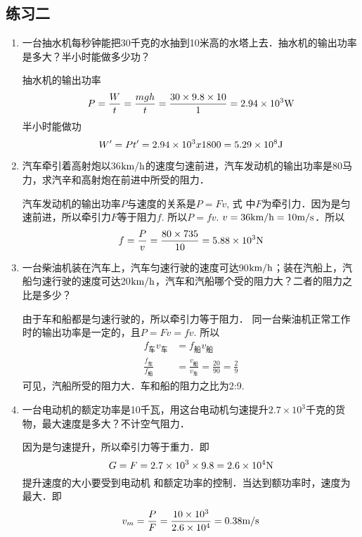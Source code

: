 \subsection{练习二}
\begin{enumerate}
    \item 一台抽水机每秒钟能把30千克的水抽到10米高的水塔上去．抽水机的输出功率是多大？半小时能做多少功？

    \begin{solution}
        抽水机的输出功率
\[P=\frac{W}{t}=\frac{mgh}{t}=\frac{30\times 9.8\times 10}{1}=2.94\times 10^3{\rm W}\]
半小时能做功
\[W'=Pt'=2.94\times10^3x1800=5.29\times10^8{\rm J}\]
    \end{solution}
    \item 汽车牵引着高射炮以36$\text{km}/\text{h}$的速度匀速前进，汽车发动机的输出功率是80马力，求汽辛和高射炮在前进中所受的阻力．

    \begin{solution}
        汽车发动机的输出功率$P$与速度的关系是$P=Fv$, 式
        中$F$为牵引力．因为是匀速前进，所以牵引力$F$等于阻力$f$.
        所以$P=fv$. $v=36\text{km}/\text{h}=10\text{m}/\text{s}$．所以
        \[f=\frac{P}{v}=\frac{80\times 735}{10}=5.88\times 10^{3}{\rm N}\]
    \end{solution}
    \item 一台柴油机装在汽车上，汽车匀速行驶的速度可达90$\text{km}/\text{h}$；装在汽船上，汽船匀速行驶的速度可达20$\text{km}/\text{h}$，汽车和汽船哪个受的阻力大？二者的阻力之比是多少？

    \begin{solution}
    由于车和船都是匀速行驶的，所以牵引力等于阻力．
同一台柴油机正常工作时的输出功率是一定的，且$P=Fv=
fv$. 所以
\[\begin{split}
    f_{\text{车}}v_{\text{车}}&=f_{\text{船}}v_{\text{船}}\\
    \frac{f_{\text{车}}}{f_{\text{船}}}&=\frac{v_{\text{船}}}{v_{\text{车}}}=\frac{20}{90}=\frac{2}{9}
\end{split}\]
可见，汽船所受的阻力大．车和船的阻力之比为2:9.
    \end{solution}
    \item 一台电动机的额定功率是10千瓦，用这台电动机匀速提升$2.7\times 10^3$千克的货物，最大速度是多大？不计空气阻力．

    \begin{solution}
因为是匀速提升，所以牵引力等于重力．即
\[G=F=
2.7\times10^3\times9.8=2.6\times10^4{\rm N}\]
提升速度的大小要受到电动机
和额定功率的控制．当达到额功率时，速度为最大．即
\[v_m=\frac{P}{F}=\frac{10\times 10^3}{2.6\times 10^4}=0.38\text{m}/\text{s}\]
    \end{solution}
\end{enumerate}



